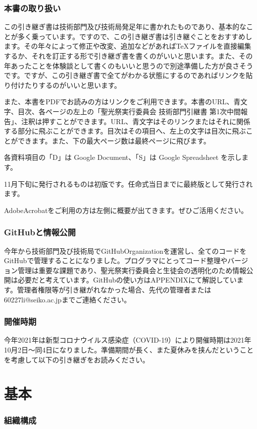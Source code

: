 \documentclass[dvipdfmx,jb5]{jarticle}
\begin{document}
\section{本書の取り扱い}
この引き継ぎ書は技術部門及び技術局発足年に書かれたものであり、基本的なことが多く乗っています。ですので、この引き継ぎ書は引き継ぐことをおすすめします。その年々によって修正や改変、追加などがあれば\TeX ファイルを直接編集するか、それを訂正する形で引き継ぎ書を書くのがいいと思います。また、その年あったことを体験談として書くのもいいと思うので別途準備した方が良さそうです。ですが、この引き継ぎ書で全てがわかる状態にするのであればリンクを貼り付けたりするのがいいと思います。

また、本書をPDFでお読みの方はリンクをご利用できます。本書のURL、青文字、目次、各ページの左上の「聖光祭実行委員会 技術部門引継書 第1次中間報告」、注釈は押すことができます。URL、青文字はそのリンクまたはそれに関係する部分に飛ぶことができます。目次はその項目へ、左上の文字は目次に飛ぶことができます。また、下の最大ページ数は最終ページに飛びます。

各資料項目の「D」は Google Document、「S」は Google Spreadsheet を示します。

11月下旬に発行されるものは初版です。任命式当日までに最終版として発行されます。

AdobeAcrobatをご利用の方は左側に概要が出てきます。ぜひご活用ください。
\section{GitHubと情報公開}
今年から技術部門及び技術局でGitHubOrganizationを運営し、全てのコードをGitHubで管理することになりました。プログラマにとってコード整理やバージョン管理は重要な課題であり、聖光祭実行委員会と生徒会の透明化のため情報公開は必要だと考えています。GitHubの使い方はAPPENDIXにて解説しています。管理者権限等が引き継がれなかった場合、先代の管理者または {\ttfamily 60227li@seiko.ac.jp}までご連絡ください。
\section{開催時期}
今年2021年は新型コロナウイルス感染症（COVID-19）により開催時期は2021年10月2日〜同4日になりました。準備期間が長く、また夏休みを挟んだということを考慮して以下の引き継ぎをお読みください。

\part{基本}
\section{組織構成}
\end{document}
